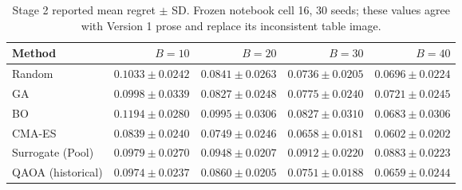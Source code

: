 \begin{table}[htbp]\centering
\caption{Stage 2 reported mean regret $\pm$ SD. Frozen notebook cell 16, 30 seeds; these values agree with Version 1 prose and replace its inconsistent table image.}\label{tab:s2}
\scriptsize
\setlength{\tabcolsep}{4pt}
\begin{tabular}{lrrrr}\toprule
Method & $B=10$ & $B=20$ & $B=30$ & $B=40$ \\ \midrule
Random & $0.1033\pm0.0242$ & $0.0841\pm0.0263$ & $0.0736\pm0.0205$ & $0.0696\pm0.0224$ \\
GA & $0.0998\pm0.0339$ & $0.0827\pm0.0248$ & $0.0775\pm0.0240$ & $0.0721\pm0.0245$ \\
BO & $0.1194\pm0.0280$ & $0.0995\pm0.0306$ & $0.0827\pm0.0310$ & $0.0683\pm0.0306$ \\
CMA-ES & $0.0839\pm0.0240$ & $0.0749\pm0.0246$ & $0.0658\pm0.0181$ & $0.0602\pm0.0202$ \\
Surrogate (Pool) & $0.0979\pm0.0270$ & $0.0948\pm0.0207$ & $0.0912\pm0.0220$ & $0.0883\pm0.0223$ \\
QAOA (historical) & $0.0974\pm0.0237$ & $0.0860\pm0.0205$ & $0.0751\pm0.0188$ & $0.0659\pm0.0244$ \\
\bottomrule\end{tabular}
\end{table}
